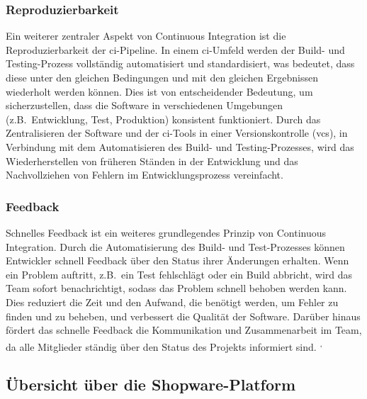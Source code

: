 \subsubsection{Reproduzierbarkeit}

Ein weiterer zentraler Aspekt von Continuous Integration ist die Reproduzierbarkeit der \acrshort{ci}-Pipeline.
In einem \acrshort{ci}-Umfeld werden der Build- und Testing-Prozess vollständig automatisiert und standardisiert, was
bedeutet, dass diese unter den gleichen Bedingungen und mit den gleichen Ergebnissen wiederholt werden können.
Dies ist von entscheidender Bedeutung, um sicherzustellen, dass die Software in verschiedenen Umgebungen
(z.B.\ Entwicklung, Test, Produktion) konsistent funktioniert.
Durch das Zentralisieren der Software und der \acrshort{ci}-Tools in einer Versionskontrolle (\acrshort{vcs}), in Verbindung mit
dem Automatisieren des Build- und Testing-Prozesses, wird das Wiederherstellen von früheren Ständen in der Entwicklung
und das Nachvollziehen von Fehlern im Entwicklungsprozess vereinfacht.

\subsubsection{Feedback}

Schnelles Feedback ist ein weiteres grundlegendes Prinzip von Continuous Integration.
Durch die Automatisierung des Build- und Test-Prozesses können Entwickler schnell Feedback über den Status ihrer
Änderungen erhalten.
Wenn ein Problem auftritt, z.B.\ ein Test fehlschlägt oder ein Build abbricht, wird das Team sofort benachrichtigt,
sodass das Problem schnell behoben werden kann.
Dies reduziert die Zeit und den Aufwand, die benötigt werden, um Fehler zu finden und zu beheben, und verbessert die
Qualität der Software.
Darüber hinaus fördert das schnelle Feedback die Kommunikation und Zusammenarbeit im Team, da alle Mitglieder ständig
über den Status des Projekts informiert sind.
\textsuperscript{,}

\subsection{Übersicht über die Shopware-Platform} \label{subsec:02-background-3}

